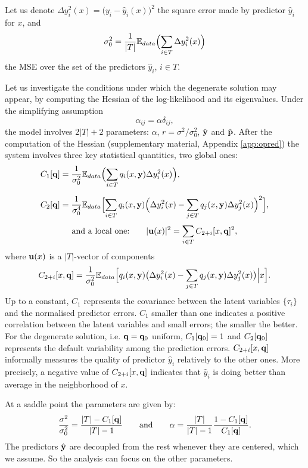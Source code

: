 Let us denote $\Delta y_i^2(x)= \bigl(y_i-\hat y_i(x)\bigr)^2$ the square error made by predictor $\hat y_i$ for $x$, and 
\[
\sigma_0^2 = \frac{1}{|T|}{\mathbb E}_{data}\Bigl(\sum_{i \in T } \Delta y_i^2(x)\Bigr)
\]
the  MSE over the set of the predictors $\hat y_i$, $i \in T$. 

Let us investigate the conditions under which the degenerate solution may appear, by computing the Hessian of the log-likelihood and its eigenvalues. Under the simplifying assumption
\[
\alpha_{ij} = \alpha \delta_{ij},
\]
the model involves $2\vert T\vert+2$ parameters: $\alpha$, $r = \sigma^2/\sigma_0^2$, $\hat {\bf y}$ and $\hat{\bf p}$. After the computation of the Hessian (supplementary material, Appendix \ref{app:opred}) the system involves three key statistical quantities, two global ones:
\begin{align}
C_1[{\bf q}] &= \frac{1}{\sigma_0^2}{\mathbb E}_{data}\Bigl(\sum_{i \in T} q_i(x,{\bf y})\Delta y_i^2(x)\Bigr),\label{def:C1}\\[0.2cm]
C_2[{\bf q}] &= \frac{1}{\sigma_0^4}{\mathbb E}_{data}\Bigl[\sum_{i\in T}q_i(x,{\bf y})\Bigl(\Delta y_i^2(x)-\sum_{j \in T} q_j(x,{\bf y})\Delta y_j^2(x)\Bigr)^2\Bigr],\label{def:C2}
\end{align}
\[
\text{and a local one:}\qquad \vert {\bf u}(x)\vert^2 = \sum_{i\in T} C_{2+i}[x,{\bf q}]^2,
\]
where ${\bf u}(x)$ is a $\vert T\vert$-vector of components 
\[
C_{2+i}[x,{\bf q}] = \frac{1}{\sigma_0^2}{\mathbb E}_{data}
\Bigl[ q_i(x,{\bf y})\bigl(\Delta y_i^2(x)-\sum_{j \in T} q_j(x,{\bf y})\Delta y_j^2(x)\bigr)\Big\vert x \Bigr].
\]
Up to a constant, $C_1$ represents the covariance between the latent variables $\{\tau_i\}$ and the normalised predictor errors. $C_1$ smaller than one 
indicates a positive correlation between the latent variables and small errors; the smaller the better. For the degenerate solution, i.e. ${\bf q}={\bf q}_{0}$ uniform, $C_1[{\bf q}_{0}]=1$ and $C_2[{\bf q}_{0}]$
represents the default variability among the prediction errors. $C_{2+i}[x,{\bf q}]$ informally measures the quality of predictor $\hat y_i$ relatively to the other ones.
More precisely, a negative value of  $C_{2+i}[x,{\bf q}]$ indicates that $\hat y_i$ is doing better than average in the neighborhood of $x$.  

At a saddle point the parameters are given by:
\[
\frac{\sigma^2}{\sigma_0^2} = \frac{\vert T\vert-C_1[{\bf q}]}{\vert T\vert-1} \qquad\text{and}\qquad
\alpha = \frac{\vert T\vert}{\vert T\vert-1}\frac{1-C_1[{\bf q}]}{C_1[{\bf q}]}.
\]
The predictors $\hat {\bf y}$ are decoupled from  the rest whenever they are centered, which we assume. So the analysis can focus on the other parameters. 
